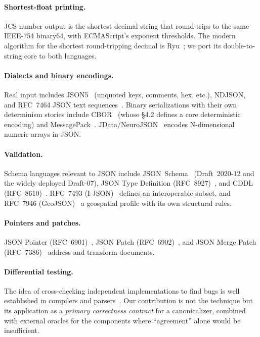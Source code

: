 \documentclass[11pt]{article}
\begin{document}
\paragraph{Shortest-float printing.}
JCS number output is the shortest decimal string that round-trips to the same
IEEE-754 binary64, with ECMAScript's exponent thresholds. The modern algorithm
for the shortest round-tripping decimal is Ryu~\cite{ryu}; we port its
double-to-string core to both languages.

\paragraph{Dialects and binary encodings.}
Real input includes JSON5~\cite{json5} (unquoted keys, comments, hex, etc.),
NDJSON, and RFC~7464 JSON text sequences~\cite{rfc7464}. Binary serializations
with their own determinism stories include CBOR~\cite{rfc8949} (whose
\S4.2 defines a core deterministic encoding) and MessagePack~\cite{msgpack}.
JData/NeuroJSON~\cite{jdata} encodes N-dimensional numeric arrays in JSON.

\paragraph{Validation.}
Schema languages relevant to JSON include JSON~Schema~\cite{jsonschema}
(Draft~2020-12 and the widely deployed Draft-07), JSON Type Definition
(RFC~8927)~\cite{rfc8927}, and CDDL (RFC~8610)~\cite{rfc8610}. RFC~7493
(I-JSON)~\cite{rfc7493} defines an interoperable subset, and RFC~7946
(GeoJSON)~\cite{rfc7946} a geospatial profile with its own structural rules.

\paragraph{Pointers and patches.}
JSON Pointer (RFC~6901)~\cite{rfc6901}, JSON Patch (RFC~6902)~\cite{rfc6902},
and JSON Merge Patch (RFC~7386)~\cite{rfc7386} address and transform documents.

\paragraph{Differential testing.}
The idea of cross-checking independent implementations to find bugs is
well established in compilers and parsers~\cite{mckeeman,csmith}. Our
contribution is not the technique but its application as a \emph{primary
correctness contract} for a canonicalizer, combined with external oracles for
the components where ``agreement'' alone would be insufficient.
\end{document}
